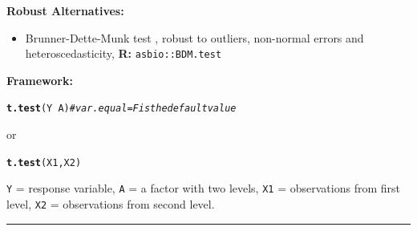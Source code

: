 \documentclass[12pt,english]{article}\usepackage[]{graphicx}\usepackage[table]{xcolor}
\makeatletter
\newcommand{\hlcom}[1]{\textcolor[rgb]{0.678,0.584,0.686}{\textit{#1}}}%
\newcommand{\hlopt}[1]{\textcolor[rgb]{0,0,0}{#1}}%
\newcommand{\hldef}[1]{\textcolor[rgb]{0.345,0.345,0.345}{#1}}%
\newcommand{\hlkwd}[1]{\textcolor[rgb]{0.737,0.353,0.396}{\textbf{#1}}}%
\newenvironment{kframe}{%
 \def\at@end@of@kframe{}%
 \ifinner\ifhmode%
  \def\at@end@of@kframe{\end{minipage}}%
  \begin{minipage}{\columnwidth}%
 \fi\fi%
 \def\FrameCommand##1{\hskip\@totalleftmargin \hskip-\fboxsep
 \colorbox{shadecolor}{##1}\hskip-\fboxsep
     \hskip-\linewidth \hskip-\@totalleftmargin \hskip\columnwidth}%
 \MakeFramed {\advance\hsize-\width
   \@totalleftmargin\z@ \linewidth\hsize
   \@setminipage}}%
 {\par\unskip\endMakeFramed%
 \at@end@of@kframe}
\newenvironment{knitrout}{}{} %
\makeatother
\begin{document}
\noindent \textbf{Robust Alternatives:}
\begin{small}
\begin{itemize}
\item Brunner-Dette-Munk test \citep{brunner1997}, robust to outliers, non-normal errors and heteroscedasticity, \textbf{R:} \texttt{asbio::BDM.test}\vspace{-.1in}
\end{itemize}
\end{small}
\vspace{0.1in}
\begin{tcolorbox}[colback=yellow!50!red!25!white,colbacktitle=yellow!50!red,colframe=black!75!white,title=\textbf{R:} Welch $t$-Test]


\textbf{Framework:}\\
\vspace{-.2in}
\begin{knitrout}
\color{fgcolor}\begin{kframe}
\begin{alltt}
\hlkwd{t.test}\hldef{(Y} \hlopt{~} \hldef{A)}\hlcom{# var.equal = F is the default value}
\end{alltt}
\end{kframe}
\end{knitrout}
\vspace{-.1in}
or
\vspace{-.1in}
\begin{knitrout}
\color{fgcolor}\begin{kframe}
\begin{alltt}
\hlkwd{t.test}\hldef{(X1, X2)}
\end{alltt}
\end{kframe}
\end{knitrout}
\texttt{Y} = response variable, \texttt{A} = a factor with two levels, \texttt{X1} = observations from first level, \texttt{X2} = observations from second level.
\vspace{0.1in}
\par\noindent\rule{.9\textwidth}{0.4pt}


\end{tcolorbox}
\end{document}
